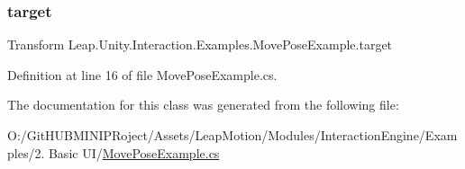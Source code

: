 \subsubsection{\texorpdfstring{target}{target}}
{\footnotesize\ttfamily Transform Leap.\+Unity.\+Interaction.\+Examples.\+Move\+Pose\+Example.\+target}



Definition at line 16 of file Move\+Pose\+Example.\+cs.



The documentation for this class was generated from the following file\+:\begin{DoxyCompactItemize}
\item 
O\+:/\+Git\+H\+U\+B\+M\+I\+N\+I\+P\+Roject/\+Assets/\+Leap\+Motion/\+Modules/\+Interaction\+Engine/\+Examples/2. Basic U\+I/\mbox{\hyperlink{_move_pose_example_8cs}{Move\+Pose\+Example.\+cs}}\end{DoxyCompactItemize}
